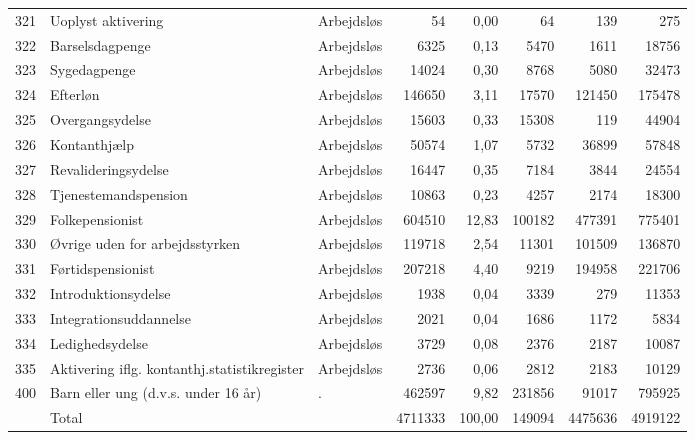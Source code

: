 \begin{table}[H]
{\begin{tabular}{@{}lllrrrrr@{}}
	321	&	Uoplyst aktivering	&	Arbejdsløs	&	54	&	0,00	&	64	&	139	&	275	\\	
	322	&	Barselsdagpenge	&	Arbejdsløs	&	6325	&	0,13	&	5470	&	1611	&	18756	\\	
	323	&	Sygedagpenge	&	Arbejdsløs	&	14024	&	0,30	&	8768	&	5080	&	32473	\\	
	324	&	Efterløn	&	Arbejdsløs	&	146650	&	3,11	&	17570	&	121450	&	175478	\\	
	325	&	Overgangsydelse	&	Arbejdsløs	&	15603	&	0,33	&	15308	&	119	&	44904	\\	
	326	&	Kontanthjælp	&	Arbejdsløs	&	50574	&	1,07	&	5732	&	36899	&	57848	\\	
	327	&	Revalideringsydelse	&	Arbejdsløs	&	16447	&	0,35	&	7184	&	3844	&	24554	\\	
	328	&	Tjenestemandspension	&	Arbejdsløs	&	10863	&	0,23	&	4257	&	2174	&	18300	\\	
	329	&	Folkepensionist	&	Arbejdsløs	&	604510	&	12,83	&	100182	&	477391	&	775401	\\	
	330	&	Øvrige uden for arbejdsstyrken	&	Arbejdsløs	&	119718	&	2,54	&	11301	&	101509	&	136870	\\	
	331	&	Førtidspensionist	&	Arbejdsløs	&	207218	&	4,40	&	9219	&	194958	&	221706	\\	
	332	&	Introduktionsydelse	&	Arbejdsløs	&	1938	&	0,04	&	3339	&	279	&	11353	\\	
	333	&	Integrationsuddannelse	&	Arbejdsløs	&	2021	&	0,04	&	1686	&	1172	&	5834	\\	
	334	&	Ledighedsydelse	&	Arbejdsløs	&	3729	&	0,08	&	2376	&	2187	&	10087	\\	
	335	&	Aktivering iflg. kontanthj.statistikregister	&	Arbejdsløs	&	2736	&	0,06	&	2812	&	2183	&	10129	\\	
	400	&	Barn eller ung (d.v.s. under 16 år)	&	.	&	462597	&	9,82	&	231856	&	91017	&	795925	\\	
		&	Total	&		&	4711333	&	100,00	&	149094	&	4475636	&	4919122	\\	\bottomrule
\end{tabular} }
\end{table}
% 

